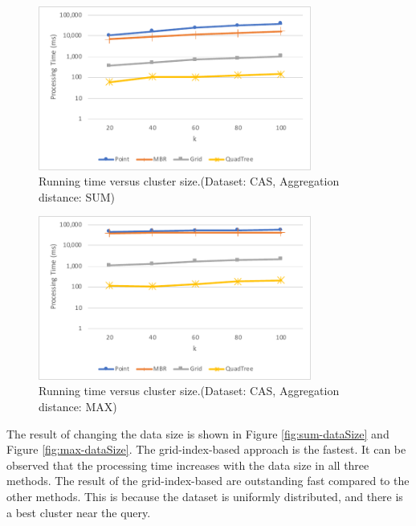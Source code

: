 \documentclass[a4paper,11pt]{report}
\theoremstyle{mytheoremstyle}
\begin{document}
\begin{figure}
    \begin{center}
        \includegraphics[width=0.8\textwidth]{src/images/CAS-SUM-K.pdf}
    \end{center}
    \caption{Running time versus cluster size.(Dataset: CAS, Aggregation distance: SUM)}
    \label{fig:sum-clusterSize-CAS}
\end{figure}

\begin{figure}
    \begin{center}
        \includegraphics[width=0.8\textwidth]{src/images/CAS-MAX-K.pdf}
    \end{center}
    \caption{Running time versus cluster size.(Dataset: CAS, Aggregation distance: MAX)}
    \label{fig:max-clusterSize-CAS}
\end{figure}

The result of changing the data size is shown in Figure \ref{fig:sum-dataSize} and Figure \ref{fig:max-dataSize}. The grid-index-based approach is the fastest. It can be observed that the processing time increases with the data size in all three methods. The result of the grid-index-based are outstanding fast compared to the other methods. This is because the dataset is uniformly distributed, and there is a best cluster near the query.
\end{document}
